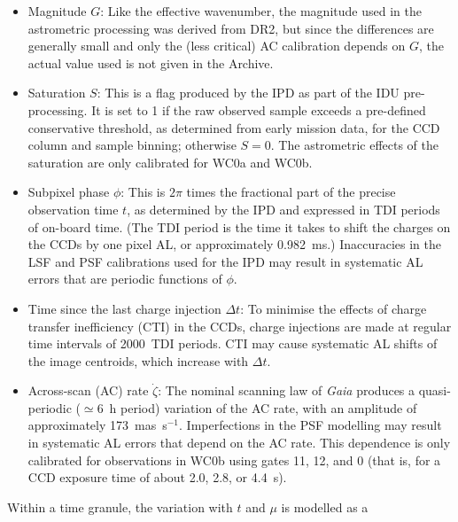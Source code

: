 \documentclass[longauth]{aa} %
\newcommand{\gacs}[1]{{\footnotesize\texttt{#1}}}
\begin{document}
\begin{itemize}
$\nu_\text{eff}$ used for the EDR3 astrometry was generated in the preceding cycle,
corresponding to DR2 photometry, and is sometimes missing or inconsistent with the 
EDR3 photometry. The actual values used for the astrometry (and IDU pre-processing)
is given in the \textit{Gaia} Archive as \gacs{nu\_eff\_used\_in\_astrometry}. For sources
without a reliable $\nu_\text{eff}$ a special calibration was employed (step~\ref{step:Cprime}
in Sect.~\ref{sec:steps}).   
\item
Magnitude $G$: Like the effective wavenumber, the magnitude used in the astrometric
processing was derived from DR2, but since the differences are generally small and only the
(less critical) AC calibration depends on $G$, the actual value used is not given in the 
Archive.  
\item
Saturation $S$: This is a flag produced by the IPD as part of the IDU pre-processing. 
It is set to 1 if the raw observed sample exceeds 
a pre-defined conservative threshold, as determined from early mission data, for the 
CCD column and sample binning; otherwise $S=0$. 
The astrometric effects of the saturation are only calibrated for WC0a and WC0b.
\item
Subpixel phase $\phi$: This is $2\pi$ times the fractional part of the precise observation 
time $t$, as determined by the IPD and expressed in TDI periods of on-board time. (The TDI 
period is the time it takes to shift the charges on the CCDs by one pixel AL, or approximately
0.982~ms.) Inaccuracies in the LSF and PSF calibrations used for the IPD may result in
systematic AL errors that are periodic functions of $\phi$.
\item
Time since the last charge injection $\Delta t$: To minimise the effects of charge transfer
inefficiency (CTI) in the CCDs, charge injections are made at regular time intervals
of 2000~TDI periods. CTI may cause systematic AL shifts of the image centroids, which
increase with $\Delta t$.    
\item
Across-scan (AC) rate $\dot{\zeta}$: The nominal scanning law of \textit{Gaia} 
 produces a quasi-periodic ($\simeq 6$~h period) variation 
of the AC rate, with an amplitude of approximately 173~mas~s$^{-1}$. Imperfections 
in the PSF modelling may result in systematic AL errors that depend on the AC rate.
This dependence is only calibrated for observations in WC0b using gates 11, 12, and 0
(that is, for a CCD exposure time of about 2.0, 2.8, or 4.4~s).
\end{itemize}
Within a time granule, the variation with $t$ and $\mu$ is modelled as a 
\end{document}
